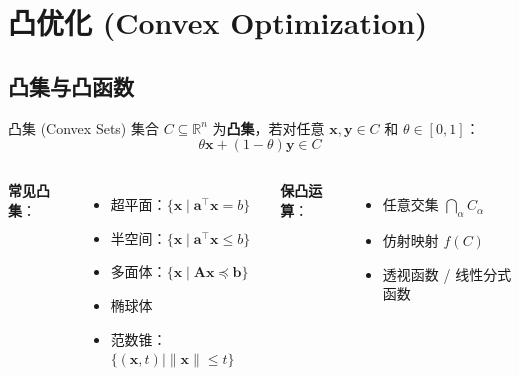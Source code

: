 \documentclass[11pt, aspectratio=169, svgnames, table, fontset=fandol]{ctexbeamer}
\newcommand{\R}{\mathbb{R}}
\begin{document}
\section{凸优化 (Convex Optimization)}

\subsection{凸集与凸函数}

\begin{frame}{凸集 (Convex Sets)}
  集合 $C \subseteq \R^n$ 为\textbf{凸集}，若对任意 $\bm{x}, \bm{y} \in C$ 和 $\theta \in [0,1]$：
  \begin{equation*}
    \theta \bm{x} + (1-\theta)\bm{y} \in C
  \end{equation*}

  \vspace{4pt}
  \begin{columns}[T]
    \textbf{常见凸集}：
    \begin{itemize}
      \item 超平面：$\{\bm{x} \mid \bm{a}^\top \bm{x} = b\}$
      \item 半空间：$\{\bm{x} \mid \bm{a}^\top \bm{x} \leq b\}$
      \item 多面体：$\{\bm{x} \mid \bm{Ax} \preceq \bm{b}\}$
      \item 椭球体
      \item 范数锥：$\{(\bm{x}, t) \mid \|\bm{x}\| \leq t\}$
    \end{itemize}
    \textbf{保凸运算}：
    \begin{itemize}
      \item 任意交集 $\bigcap_\alpha C_\alpha$
      \item 仿射映射 $f(C)$
      \item 透视函数 / 线性分式函数
    \end{itemize}
  \end{columns}
\end{frame}
\end{document}
